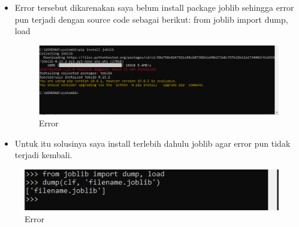 \begin{itemize}
\item Error tersebut dikarenakan saya belum install package joblib sehingga error pun terjadi dengan source code sebagai berikut:
from joblib import dump, load

\begin{figure}[ht]
\centering
\includegraphics[scale=0.5]{figures/i21.png}
\caption{Error}
\end{figure}

\item Untuk itu solusinya saya install terlebih dahulu joblib agar error pun tidak terjadi kembali.
\end{itemize}

\begin{figure}[ht]
\centering
\includegraphics[scale=0.5]{figures/i22.png}
\caption{Error}
\end{figure}

